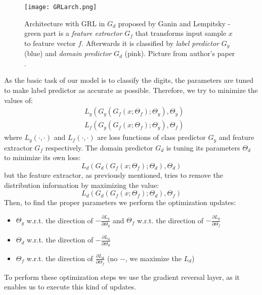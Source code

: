 \documentclass{article}
\begin{document}
\begin{figure}%
    \centering
    \texttt{[image: GRLarch.png]}%
    \caption{Architecture with GRL in $G_{d}$ proposed by Ganin and Lempitsky - green part is a \textit{feature extractor} $G_{f}$ that transforms input sample $x$ to feature vector $f$. Afterwards it is classified by \textit{label predictor} $G_{y}$ (blue) and \textit{domain predictor} $G_{d}$ (pink). Picture from author's paper \cite{pmlr-v37-ganin15}.}
    \label{fig:GRLarch}%
\end{figure}
\par
As the basic task of our model is to classify the digits, the parameters are tuned to make label predictor as accurate as possible. Therefore, we try to minimize the values of:
\begin{align*}
    &L_{y}( G_y( G_{f}( x ; \Theta_{f} ) ; \Theta_{y} ) , \Theta_{y} )\\
    &L_{f}( G_y( G_{f}( x ; \Theta_{f} ) ; \Theta_{y} ) , \Theta_{f} )
\end{align*}
where $L_{y}(\cdot , \cdot)$ and $L_f(\cdot , \cdot)$ are loss functions of class predictor $G_{y}$ and feature extractor $G_{f}$ respectively. The domain predictor $G_{d}$ is tuning its parameters $\Theta_{d}$ to minimize its own loss:
\begin{equation*}
    L_{d}( G_{d}( G_{f}(x ; \Theta_{f}) ; \Theta_{d} ) , \Theta_{d} )
\end{equation*}
but the feature extractor, as previously mentioned, tries to remove the distribution information by maximizing the value:
\begin{equation*}
    L_{d}( G_{d}( G_{f}(x ; \Theta_{f}) ; \Theta_{d} ) , \Theta_{f} ) 
\end{equation*}
Then, to find the proper parameters we perform the optimization updates:
\begin{itemize}
    \item $\Theta_{y}$ w.r.t. the direction of $-\frac{\partial L_{y}}{\partial \Theta_{y}}$ and $\Theta_{f}$ w.r.t. the direction of $-\frac{\partial L_{y}}{\partial \Theta_{f}}$
    \item $\Theta_{d}$ w.r.t. the direction of $-\frac{\partial L_{d}}{\partial \Theta_{d}}$
    \item $\Theta_{f}$ w.r.t. the direction of $\frac{\partial L_{d}}{\partial \Theta_{f}}$ (no $-$, we maximize the $L_{d}$)
\end{itemize}
\par
To perform these optimization steps we use the gradient reversal layer, as it enables us to execute this kind of updates.
\end{document}
